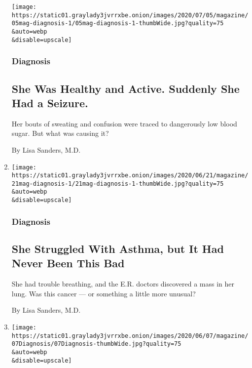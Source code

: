 \begin{enumerate}
  \texttt{[image: https://static01.graylady3jvrrxbe.onion/images/2020/07/05/magazine/05mag-diagnosis-1/05mag-diagnosis-1-thumbWide.jpg?quality=75\\\&auto=webp\\\&disable=upscale]}

  \hypertarget{diagnosis-4}{%
  \subsubsection{Diagnosis}\label{diagnosis-4}}

  \hypertarget{she-was-healthy-and-active-suddenly-she-had-a-seizure}{%
  \subsection{She Was Healthy and Active. Suddenly She Had a
  Seizure.}\label{she-was-healthy-and-active-suddenly-she-had-a-seizure}}

  Her bouts of sweating and confusion were traced to dangerously low
  blood sugar. But what was causing it?

  By Lisa Sanders, M.D.
\item
  \href{/2020/06/17/magazine/foreign-body-aspiration-diagnosis.html}{}

  \texttt{[image: https://static01.graylady3jvrrxbe.onion/images/2020/06/21/magazine/21mag-diagnosis-1/21mag-diagnosis-1-thumbWide.jpg?quality=75\\\&auto=webp\\\&disable=upscale]}

  \hypertarget{diagnosis-5}{%
  \subsubsection{Diagnosis}\label{diagnosis-5}}

  \hypertarget{she-struggled-with-asthma-but-it-had-never-been-this-bad}{%
  \subsection{She Struggled With Asthma, but It Had Never Been This
  Bad}\label{she-struggled-with-asthma-but-it-had-never-been-this-bad}}

  She had trouble breathing, and the E.R. doctors discovered a mass in
  her lung. Was this cancer --- or something a little more unusual?

  By Lisa Sanders, M.D.
\item
  \href{/2020/06/03/magazine/the-boy-slumped-to-the-floor-could-these-be-seizures.html}{}

  \texttt{[image: https://static01.graylady3jvrrxbe.onion/images/2020/06/07/magazine/07Diagnosis/07Diagnosis-thumbWide.jpg?quality=75\\\&auto=webp\\\&disable=upscale]}


\end{enumerate}
